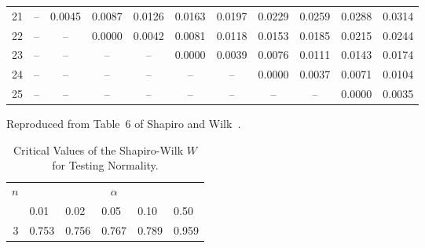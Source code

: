 \documentclass[draft]{article}
\begin{document}
\begin{table}
\begin{center}
\begin{tabular}{rcccccccccc}
21&  --  &0.0045&0.0087&0.0126&0.0163&0.0197&0.0229&0.0259&0.0288&0.0314\\
22&  --  &  --  &0.0000&0.0042&0.0081&0.0118&0.0153&0.0185&0.0215&0.0244\\
23&  --  &  --  &  --  &  --  &0.0000&0.0039&0.0076&0.0111&0.0143&0.0174\\
24&  --  &  --  &  --  &  --  &  --  &  --  &0.0000&0.0037&0.0071&0.0104\\
25&  --  &  --  &  --  &  --  &  --  &  --  &  --  &  --  &0.0000&0.0035\\
\hline
\end{tabular}
\end{center}
\normalsize
\end{table}
\clearpage

\begin{table}
\caption{Critical Values of the Shapiro-Wilk \(W\) for Testing Normality.}
\centerline{Reproduced from Table~6 of Shapiro and Wilk~\cite{shapiro65}.}
\label{tbl:w-test}
\begin{center}
\begin{tabular}{rlllll}\hline
\(n\) & \multicolumn{5}{c}{\(\alpha\)} \\ \cline{2-6}
& 0.01 & 0.02 & 0.05 & 0.10 & 0.50 \\ \hline
3 & 0.753 & 0.756 & 0.767 & 0.789 & 0.959 \\ \hline
\end{tabular}
\end{center}
\normalsize
\end{table}
\clearpage
\end{document}
